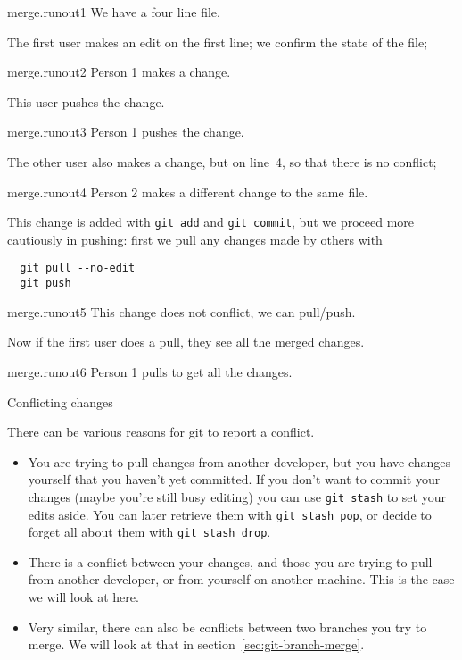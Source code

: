\begin{gitstep}{merge.runout1}
  We have a four line file.
\end{gitstep}

The first user makes an edit on the first line; we confirm the state of the file;

\begin{gitstep}{merge.runout2}
  Person 1 makes a change.
\end{gitstep}

This user pushes the change.

\begin{gitstep}{merge.runout3}
  Person 1 pushes the change.
\end{gitstep}

The other user also makes a change, but on line~4, so that there is no conflict;

\begin{gitstep}{merge.runout4}
  Person 2 makes a different change to the same file.
\end{gitstep}

This change is added with \lstinline{git add} and \lstinline{git commit},
but we proceed more cautiously in pushing: first we pull any changes made by others with
\begin{lstlisting}
  git pull --no-edit
  git push
\end{lstlisting}

\begin{gitstep}{merge.runout5}
  This change does not conflict, we can pull/push.
\end{gitstep}

Now if the first user does a pull, they see all the merged changes.

\begin{gitstep}{merge.runout6}
  Person 1 pulls to get all the changes.
\end{gitstep}

\newpage
{} {Conflicting changes}
\label{sec:git-conflict}

There can be various reasons for git to report a conflict.
\begin{itemize}
\item You are trying to pull changes from another developer, but you have changes
  yourself that you haven't yet committed.
  If you don't want to commit your changes
  (maybe you're still busy editing)
  you can use \lstinline{git stash} to set your edits aside.
  You can later retrieve them with \lstinline{git stash pop},
  or decide to forget all about them with \lstinline{git stash drop}.
\item There is a conflict between your changes, and those you are trying to pull
  from another developer, or from yourself on another machine.
  This is the case we will look at here.
\item Very similar, there can also be conflicts between two branches you try to merge.
  We will look at that in section~\ref{sec:git-branch-merge}.
\end{itemize}

